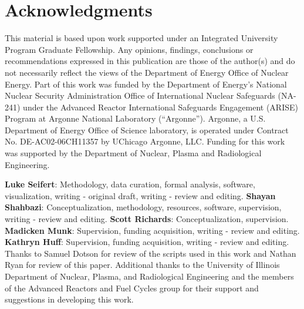 \documentclass{style/nseJournal}
\providecommand{\DIFaddbegin}{} %
\providecommand{\DIFaddend}{} %
\begin{document}
\DIFaddbegin 


\DIFaddend %

\pagebreak
\section*{Acknowledgments}
This material is based upon work supported under an Integrated University Program Graduate
Fellowship.
Any opinions, findings, conclusions or recommendations expressed in this publication are
those of the author(s) and do not necessarily reflect the views of the Department of Energy
Office of Nuclear Energy.
Part of this work was funded by the Department of Energy’s National Nuclear Security Administration Office of International Nuclear Safeguards (NA-241) under the Advanced Reactor International Safeguards Engagement (ARISE) Program at Argonne National Laboratory (“Argonne”). Argonne, a U.S. Department of Energy Office of Science laboratory, is operated under Contract No. DE-AC02-06CH11357 by UChicago Argonne, LLC.
Funding for this work was supported by the Department of Nuclear, Plasma and Radiological Engineering.

\textbf{Luke Seifert}: Methodology, data curation, formal analysis, software, visualization, writing - original draft, writing - review and editing.
\textbf{Shayan Shahbazi}: Conceptualization, methodology, resources, software, supervision, writing - review and editing.
\textbf{Scott Richards}: Conceptualization, supervision.
\textbf{Madicken Munk}: Supervision, funding acquisition, writing - review and editing.
\textbf{Kathryn Huff}: Supervision, funding acquisition, writing - review and editing.
Thanks to Samuel Dotson for review of the scripts used in this work and Nathan Ryan for review of this paper.
Additional thanks to the University of Illinois Department of Nuclear, Plasma, and Radiological Engineering and the members of the Advanced Reactors and Fuel Cycles group for their support and suggestions in developing this work.


\pagebreak

\end{document}
